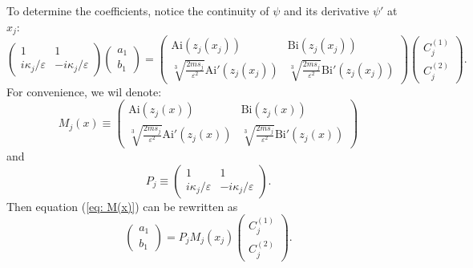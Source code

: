 \documentclass[12pt]{article}       %
\begin{document}
To determine the coefficients, notice the continuity of $\psi$ and its derivative $\psi'$ at $x_j$:
\begin{equation}\label{eq: M(x)}
    \left(
    \begin{matrix}
        1 & 1 \\
        i\kappa_j/\varepsilon & -i\kappa_j/\varepsilon
    \end{matrix}\right)
    \left(\begin{matrix}
        a_1 \\
        b_1
    \end{matrix}\right)
    =
    \left(\begin{matrix}
        \mathrm{Ai}(z_j(x_j)) & \mathrm{Bi}(z_j(x_j)) \\
        \sqrt[3]{\frac{2ms_j}{\varepsilon^2}}\mathrm{Ai}'(z_j(x_j)) & \sqrt[3]{\frac{2ms_j}{\varepsilon^2}}\mathrm{Bi}'(z_j(x_j))
    \end{matrix}\right)
    \left(
    \begin{matrix}
        C_j^{(1)} \\
        C_j^{(2)}
    \end{matrix}\right).
\end{equation}
For convenience, we wil denote:
\begin{equation}
    M_j(x) \equiv \left(\begin{matrix}
        \mathrm{Ai}(z_j(x)) & \mathrm{Bi}(z_j(x)) \\
        \sqrt[3]{\frac{2ms_j}{\varepsilon^2}}\mathrm{Ai}'(z_j(x)) & \sqrt[3]{\frac{2ms_j}{\varepsilon^2}}\mathrm{Bi}'(z_j(x))
    \end{matrix}\right)
\end{equation}
and 
\begin{equation}
    P_j \equiv  \left(
    \begin{matrix}
        1 & 1 \\
        i\kappa_j/\varepsilon & -i\kappa_j/\varepsilon
    \end{matrix}\right).
\end{equation}
Then equation (\ref{eq: M(x)}) can be rewritten as 
\begin{equation}
        \left(\begin{matrix}
        a_1 \\
        b_1
    \end{matrix}\right)
    = P_jM_j(x_j)
    \left(\begin{matrix}
        C_j^{(1)} \\
        C_j^{(2)}
    \end{matrix}\right).
\end{equation}
\end{document}
